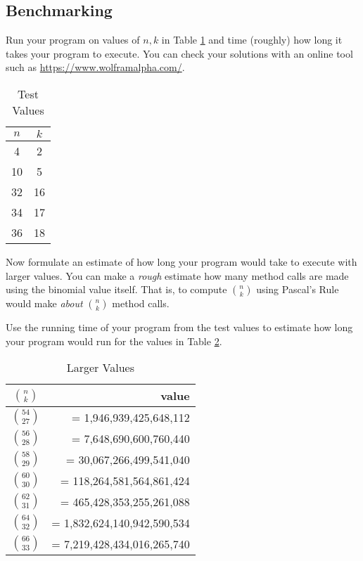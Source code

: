 \documentclass[12pt]{scrartcl}
\begin{document}
\subsection*{Benchmarking}

Run your program on values of $n, k$ in Table \ref{table:easyValues} 
and time (roughly) how long it takes your program to execute.  You
can check your solutions with an online tool such as 
\url{https://www.wolframalpha.com/}.

\begin{table}[ht]
\centering
\begin{tabular}{c|c}
$n$ & $k$ \\
\hline\hline
4 & 2 \\
10 & 5 \\
32 & 16 \\  %
34 & 17 \\  %
36 & 18 \\ %
\end{tabular}
\caption{Test Values}
\label{table:easyValues}
\end{table}

Now formulate an estimate of how long your program would take to 
execute with larger values.  You can make a \emph{rough} estimate 
how many method calls are made using the binomial value itself.  
That is, to compute ${n \choose k}$ using Pascal's Rule would make 
\emph{about} ${n \choose k}$ method calls.

Use the running time of your program from the test values to 
estimate how long your program would run for the values in 
Table \ref{table:hardValues}.

\begin{table}[ht]
\centering
\begin{tabular}{c|r}
${n \choose k}$ &  value \\
\hline\hline
${54 \choose 27}$ & =     1,946,939,425,648,112 \\
${56 \choose 28}$ & =     7,648,690,600,760,440 \\
${58 \choose 29}$ & =    30,067,266,499,541,040 \\
${60 \choose 30}$ & =   118,264,581,564,861,424 \\
${62 \choose 31}$ & =   465,428,353,255,261,088 \\
${64 \choose 32}$ & = 1,832,624,140,942,590,534 \\
${66 \choose 33}$ & = 7,219,428,434,016,265,740 \\
\end{tabular}
\caption{Larger Values}
\label{table:hardValues}
\end{table}
\end{document}
